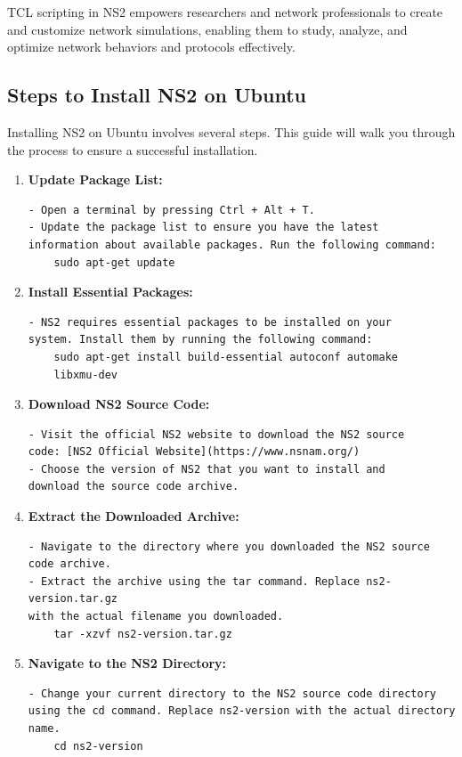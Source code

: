 \documentclass[11pt]{article}
\begin{document}
TCL scripting in NS2 empowers researchers and network professionals to create and customize network simulations, enabling them to study, analyze, and optimize network behaviors and protocols effectively.

\subsection{Steps to Install NS2 on Ubuntu}

Installing NS2 on Ubuntu involves several steps. This guide will walk you through the process to ensure a successful installation.

\begin{enumerate}
    \item \textbf{Update Package List:}
          \begin{verbatim}
- Open a terminal by pressing Ctrl + Alt + T.
- Update the package list to ensure you have the latest 
information about available packages. Run the following command:
    sudo apt-get update
       \end{verbatim}

    \item \textbf{Install Essential Packages:}
          \begin{verbatim}
- NS2 requires essential packages to be installed on your 
system. Install them by running the following command:
    sudo apt-get install build-essential autoconf automake 
    libxmu-dev
       \end{verbatim}

    \item \textbf{Download NS2 Source Code:}
          \begin{verbatim}
- Visit the official NS2 website to download the NS2 source 
code: [NS2 Official Website](https://www.nsnam.org/)
- Choose the version of NS2 that you want to install and 
download the source code archive.
       \end{verbatim}

    \item \textbf{Extract the Downloaded Archive:}
          \begin{verbatim}
- Navigate to the directory where you downloaded the NS2 source 
code archive.
- Extract the archive using the tar command. Replace ns2-version.tar.gz 
with the actual filename you downloaded.
    tar -xzvf ns2-version.tar.gz
       \end{verbatim}

    \item \textbf{Navigate to the NS2 Directory:}
          \begin{verbatim}
- Change your current directory to the NS2 source code directory 
using the cd command. Replace ns2-version with the actual directory name.
    cd ns2-version
       \end{verbatim}


\end{enumerate}
\end{document}
